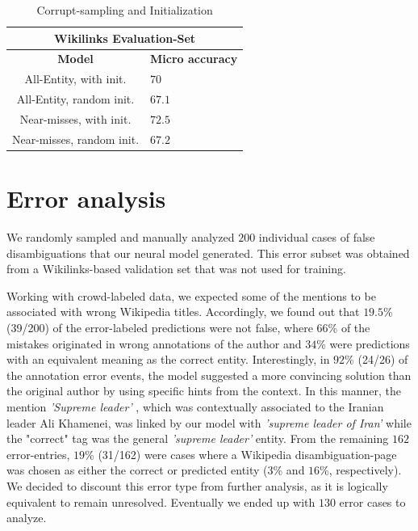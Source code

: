 \documentclass[11pt]{article}
\begin{document}
	
	\begin{table}[h]
		\begin{center}
			\begin{tabular}{|c| p{1.5cm}|}
				\hline \multicolumn{2}{|c|}{Wikilinks Evaluation-Set} \\
				\hline \bf Model & \bf Micro     accuracy  \\ \hline
				All-Entity, with init. & $70$ \\ 
				All-Entity, random init. & $67.1$ \\ 
				Near-misses, with init. & $72.5$ \\ 
				Near-misses, random init. & $67.2$ \\ 
				\hline
			\end{tabular}
		\end{center}
		\caption{\label{tab:c} Corrupt-sampling and Initialization}
	\end{table}
	
	
	\section{Error analysis}
	
	We randomly sampled and manually analyzed $200$ individual cases of false disambiguations that our neural model generated. This error subset was obtained from a Wikilinks-based validation set that was not used for training. 
	
	Working with crowd-labeled data, we expected some of the mentions to be associated with wrong Wikipedia titles. Accordingly, we found out that $19.5$\% (39/200) of the error-labeled predictions were not false, where $66$\% of the mistakes originated in wrong annotations of the author and $34$\% were predictions with an equivalent meaning as the correct entity. Interestingly, in $92$\% (24/26) of the annotation error events, the model suggested a more convincing solution than the original author by using specific hints from the context. In this manner, the  mention \textit{'Supreme leader'} , which was contextually associated to the Iranian leader Ali Khamenei, was linked by our model with \textit{'supreme leader of Iran'} while the "correct" tag was the general \textit{'supreme leader'} entity.
	From the remaining $162$ error-entries, $19$\% (31/162) were cases where a Wikipedia disambiguation-page was chosen as either the correct or predicted entity ($3$\% and $16$\%, respectively). We decided to discount this error type from further analysis, as it is logically equivalent to remain unresolved. Eventually we ended up with $130$ error cases to analyze.
	
\end{document}
